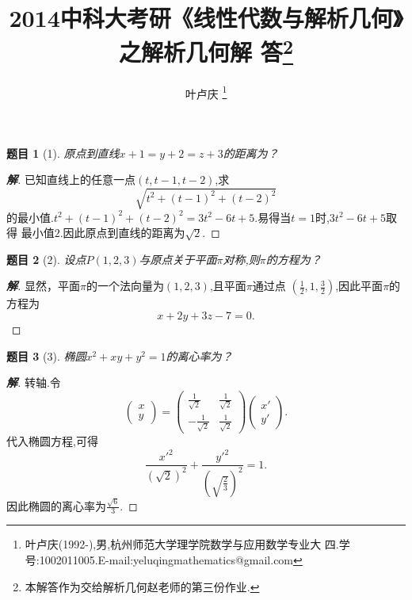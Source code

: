 ﻿\documentclass[a4paper]{article}
\newtheorem*{exe}{题目}
\newenvironment{exercise}
{\bigskip\begin{mdframed}\begin{exe}}
    {\end{exe}\end{mdframed}\bigskip}
\numberwithin{equation}{section}
\begin{document}
\title{{\bf{2014中科大考研《线性代数与解析几何》之解析几何解
      答\footnote{本解答作为交给解析几何赵老师的第三份作业.}}}} \author{\small{叶卢庆
    \footnote{叶卢庆(1992-),男,杭州师范大学理学院数学与应用数学专业大
      四.学号:1002011005.E-mail:yeluqingmathematics@gmail.com}}}
\maketitle
\begin{exercise}[1]
原点到直线$x+1=y+2=z+3$的距离为？  
\end{exercise}
\begin{proof}[\textbf{解}]
已知直线上的任意一点$(t,t-1,t-2)$,求
$$
\sqrt{t^2+(t-1)^2+(t-2)^2}
$$
的最小值.$t^2+(t-1)^2+(t-2)^2=3t^2-6t+5$.易得当$t=1$时,$3t^2-6t+5$取得
最小值$2$.因此原点到直线的距离为$\sqrt{2}$.
\end{proof}
\begin{exercise}[2]
设点$P(1,2,3)$与原点关于平面$\pi$对称,则$\pi$的方程为？  
\end{exercise}
\begin{proof}[\textbf{解}]
显然，平面$\pi$的一个法向量为$(1,2,3)$,且平面$\pi$通过点
$(\frac{1}{2},1,\frac{3}{2})$,因此平面$\pi$的方程为
$$
x+2y+3z-7=0.
$$
\end{proof}
\begin{exercise}[3]
椭圆$x^2+xy+y^2=1$的离心率为？  
\end{exercise}
\begin{proof}[\textbf{解}]
转轴.令
$$
\begin{pmatrix}
  x\\
y
\end{pmatrix}=
\begin{pmatrix}
  \frac{1}{\sqrt{2}}&\frac{1}{\sqrt{2}}\\
-\frac{1}{\sqrt{2}}&\frac{1}{\sqrt{2}}
\end{pmatrix}
\begin{pmatrix}
  x'\\
y'
\end{pmatrix}.
$$
代入椭圆方程,可得
$$
\frac{x'^2}{(\sqrt{2})^{2}}+\frac{y'^2}{(\sqrt{\frac{2}{3}})^2}=1.
$$
因此椭圆的离心率为$\frac{\sqrt{6}}{3}$.
\end{proof}
\end{document}
